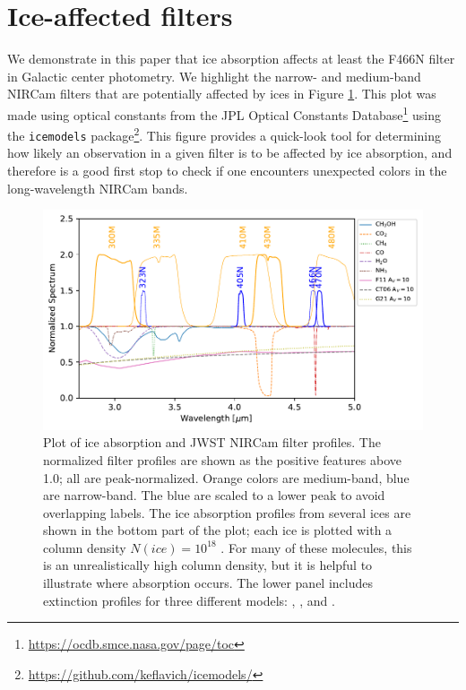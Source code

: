 \documentclass[times,astrosymb,twocolumn]{aastex631}
\def\rr#1{#1}
\begin{document}
\section{Ice-affected filters}
We demonstrate in this paper that ice absorption affects at least the F466N filter in Galactic center photometry.
We highlight the narrow- and medium-band NIRCam filters that are potentially affected by ices in Figure \ref{fig:iceaffectedfilters}.
This plot was made using optical constants from the  JPL Optical Constants Database\footnote{\url{https://ocdb.smce.nasa.gov/page/toc}} using the \texttt{icemodels} package\footnote{\url{https://github.com/keflavich/icemodels/}}.
\rr{This figure provides a quick-look tool for determining how likely an observation in a given filter is to be affected by ice absorption, and therefore is a good first stop to check if one encounters unexpected colors in the long-wavelength NIRCam bands.}

\begin{figure}
    \includegraphics[]{figures/NIRCAM_IceAffectedFilters.pdf}
    \caption{Plot of ice absorption and JWST NIRCam filter profiles.
    The normalized filter profiles are shown as the positive features above 1.0\rr{; all are peak-normalized}.
    Orange colors are medium-band, blue are narrow-band.
    \rr{The blue are scaled to a lower peak to avoid overlapping labels.}
    The ice absorption profiles from several ices are shown in the bottom part of the plot; each ice is plotted with a column density $N(ice)=10^{18}$ \persc.
    For many of these molecules, this is an unrealistically high column density, but it is helpful to illustrate where absorption occurs.
    The \rr{lower panel includes} extinction profiles for three different models: \citet{Chiar2006}, \citet{Fritz2011}, and \citet{Gordon2021}.
    }
    \label{fig:iceaffectedfilters}
\end{figure}
\end{document}
